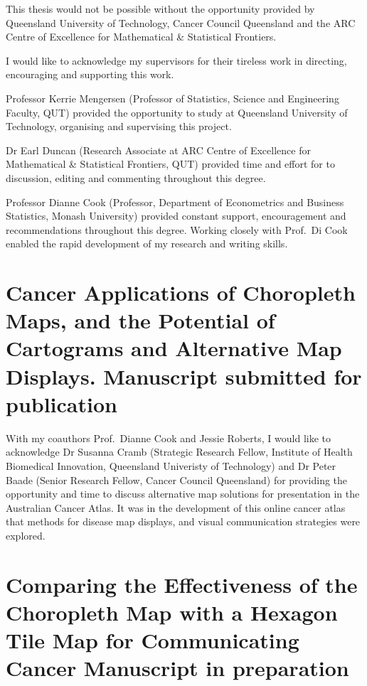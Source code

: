 \documentclass{monashthesis}
\begin{document}
This thesis would not be possible without the opportunity provided by Queensland University of Technology, Cancer Council Queensland and the ARC Centre of Excellence for Mathematical \& Statistical Frontiers.

I would like to acknowledge my supervisors for their tireless work in directing, encouraging and supporting this work.

Professor Kerrie Mengersen (Professor of Statistics, Science and Engineering Faculty, QUT) provided the opportunity to study at Queensland University of Technology, organising and supervising this project.

Dr Earl Duncan (Research Associate at ARC Centre of Excellence for Mathematical \& Statistical Frontiers, QUT) provided time and effort for to discussion, editing and commenting throughout this degree.

Professor Dianne Cook (Professor, Department of Econometrics and Business Statistics, Monash University) provided constant support, encouragement and recommendations throughout this degree.
Working closely with Prof.~Di Cook enabled the rapid development of my research and writing skills.

\hypertarget{cancer-applications-of-choropleth-maps-and-the-potential-of-cartograms-and-alternative-map-displays.-manuscript-submitted-for-publication}{%
\section{Cancer Applications of Choropleth Maps, and the Potential of Cartograms and Alternative Map Displays. Manuscript submitted for publication}\label{cancer-applications-of-choropleth-maps-and-the-potential-of-cartograms-and-alternative-map-displays.-manuscript-submitted-for-publication}}

With my coauthors Prof.~Dianne Cook and Jessie Roberts, I would like to acknowledge Dr Susanna Cramb (Strategic Research Fellow, Institute of Health Biomedical Innovation, Queensland Univeristy of Technology) and Dr Peter Baade (Senior Research Fellow, Cancer Council Queensland) for providing the opportunity and time to discuss alternative map solutions for presentation in the Australian Cancer Atlas.
It was in the development of this online cancer atlas that methods for disease map displays, and visual communication strategies were explored.

\hypertarget{comparing-the-effectiveness-of-the-choropleth-map-with-a-hexagon-tile-map-for-communicating-cancer-manuscript-in-preparation}{%
\section{Comparing the Effectiveness of the Choropleth Map with a Hexagon Tile Map for Communicating Cancer Manuscript in preparation}\label{comparing-the-effectiveness-of-the-choropleth-map-with-a-hexagon-tile-map-for-communicating-cancer-manuscript-in-preparation}}
\end{document}
